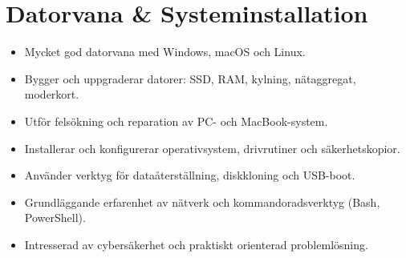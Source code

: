 \section*{Datorvana \& Systeminstallation}
\begin{itemize}
  \item Mycket god datorvana med Windows, macOS och Linux.
  \item Bygger och uppgraderar datorer: SSD, RAM, kylning, nätaggregat, moderkort.
  \item Utför felsökning och reparation av PC- och MacBook-system.
  \item Installerar och konfigurerar operativsystem, drivrutiner och säkerhetskopior.
  \item Använder verktyg för dataåterställning, diskkloning och USB-boot.
  \item Grundläggande erfarenhet av nätverk och kommandoradsverktyg (Bash, PowerShell).
  \item Intresserad av cybersäkerhet och praktiskt orienterad problemlösning.
\end{itemize}
